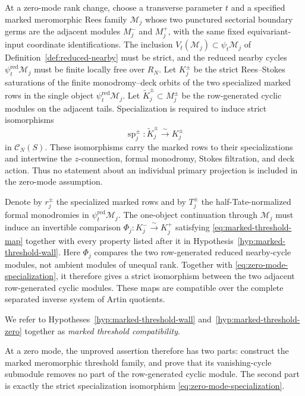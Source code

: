 \begin{hypothesis}
\label{hyp:marked-threshold-zero}
At a zero-mode rank change, choose a transverse parameter \(t\) and a
specified marked meromorphic Rees family \(\mathcal M_j\) whose two punctured
sectorial boundary germs are the adjacent modules \(M_j^-\) and \(M_j^+\),
with the same fixed equivariant-input coordinate identifications.  The
inclusion \(V_t(\mathcal M_j)\subset\psi_t\mathcal M_j\) of
Definition~\ref{def:reduced-nearby} must be strict, and the reduced nearby
cycles \(\psi_t^{\mathrm{red}}\mathcal M_j\) must be finite locally free
over \(R_N\).  Let \(K_j^\pm\) be the strict Rees--Stokes saturations of the finite
monodromy--deck orbits of the two specialized marked rows in the single object
\(\psi_t^{\mathrm{red}}\mathcal M_j\).  Let
\(\widetilde K_j^\pm\subset M_j^\pm\) be
the row-generated cyclic modules on the adjacent tails.  Specialization is
required to induce strict isomorphisms
\begin{equation}\label{eq:zero-mode-specialization}
 \operatorname{sp}_j^\pm:\widetilde K_j^\pm
   \xrightarrow{\sim}K_j^\pm
\end{equation}
in \(\mathcal C_N(S)\).  These isomorphisms carry the marked rows to their
specializations and intertwine the \(z\)-connection, formal monodromy, Stokes
filtration, and deck action.  Thus no statement about an individual primary
projection is included in the zero-mode assumption.

Denote by \(r_j^\pm\) the specialized marked rows and by \(T_j^\pm\) the
half-Tate-normalized formal monodromies in
\(\psi_t^{\mathrm{red}}\mathcal M_j\).  The one-object continuation through
\(\mathcal M_j\) must induce an
invertible comparison \(\Phi_j:K_j^-\xrightarrow{\sim}K_j^+\) satisfying
\eqref{eq:marked-threshold-map} together with every property listed after it
in Hypothesis~\ref{hyp:marked-threshold-wall}.  Here \(\Phi_j\) compares the
two row-generated reduced nearby-cycle modules, not ambient modules of
unequal rank.  Together with \eqref{eq:zero-mode-specialization}, it
therefore gives a strict isomorphism between the two adjacent row-generated
cyclic modules.  These maps are compatible over the complete separated
inverse system of Artin quotients.
\end{hypothesis}

We refer to Hypotheses~\ref{hyp:marked-threshold-wall}
and~\ref{hyp:marked-threshold-zero} together as \emph{marked threshold
compatibility}.

At a zero mode, the unproved assertion therefore has two parts: construct the
marked meromorphic threshold family, and prove that its vanishing-cycle
submodule removes no part of the row-generated cyclic module.  The second
part is exactly the strict specialization isomorphism
\eqref{eq:zero-mode-specialization}.

